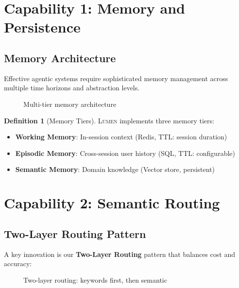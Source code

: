 \documentclass[11pt,a4paper]{article}
\theoremstyle{definition}
\newtheorem{definition}{Definition}[section]
\theoremstyle{remark}
\newcommand{\lumen}{\textsc{Lumen}\xspace}
\begin{document}

\section{Capability 1: Memory and Persistence}
\label{sec:memory}

\subsection{Memory Architecture}

Effective agentic systems require sophisticated memory management across multiple time horizons and abstraction levels.

\begin{figure}[H]
    \centering
    
    \caption{Multi-tier memory architecture}
    \label{fig:memory}
\end{figure}

\begin{definition}[Memory Tiers]
\lumen implements three memory tiers:
\begin{itemize}
    \item \textbf{Working Memory}: In-session context (Redis, TTL: session duration)
    \item \textbf{Episodic Memory}: Cross-session user history (SQL, TTL: configurable)
    \item \textbf{Semantic Memory}: Domain knowledge (Vector store, persistent)
\end{itemize}
\end{definition}

\section{Capability 2: Semantic Routing}
\label{sec:routing}

\subsection{Two-Layer Routing Pattern}

A key innovation is our \textbf{Two-Layer Routing} pattern that balances cost and accuracy:

\begin{figure}[H]
    \centering
    
    \caption{Two-layer routing: keywords first, then semantic}
    \label{fig:routing}
\end{figure}
\end{document}

